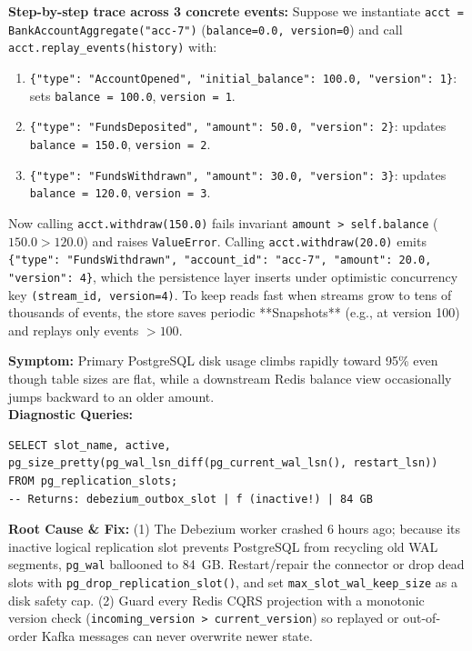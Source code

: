 \textbf{Step-by-step trace across 3 concrete events:}
Suppose we instantiate \texttt{acct = BankAccountAggregate("acc-7")} (\texttt{balance=0.0, version=0}) and call \texttt{acct.replay\_events(history)} with:
\begin{enumerate}[leftmargin=18pt]
  \item \texttt{\{"type": "AccountOpened", "initial\_balance": 100.0, "version": 1\}}: sets \texttt{balance = 100.0}, \texttt{version = 1}.
  \item \texttt{\{"type": "FundsDeposited", "amount": 50.0, "version": 2\}}: updates \texttt{balance = 150.0}, \texttt{version = 2}.
  \item \texttt{\{"type": "FundsWithdrawn", "amount": 30.0, "version": 3\}}: updates \texttt{balance = 120.0}, \texttt{version = 3}.
\end{enumerate}
Now calling \texttt{acct.withdraw(150.0)} fails invariant \texttt{amount > self.balance} ($150.0 > 120.0$) and raises \texttt{ValueError}. Calling \texttt{acct.withdraw(20.0)} emits \texttt{\{"type": "FundsWithdrawn", "account\_id": "acc-7", "amount": 20.0, "version": 4\}}, which the persistence layer inserts under optimistic concurrency key \texttt{(stream\_id, version=4)}. To keep reads fast when streams grow to tens of thousands of events, the store saves periodic **Snapshots** (e.g., at version 100) and replays only events $> 100$.

\begin{realworldbox}
\textbf{Symptom:} Primary PostgreSQL disk usage climbs rapidly toward 95\% even though table sizes are flat, while a downstream Redis balance view occasionally jumps backward to an older amount.\\
\textbf{Diagnostic Queries:}
\begin{verbatim}
SELECT slot_name, active, pg_size_pretty(pg_wal_lsn_diff(pg_current_wal_lsn(), restart_lsn))
FROM pg_replication_slots;
-- Returns: debezium_outbox_slot | f (inactive!) | 84 GB
\end{verbatim}
\textbf{Root Cause \& Fix:} (1) The Debezium worker crashed 6 hours ago; because its inactive logical replication slot prevents PostgreSQL from recycling old WAL segments, \texttt{pg\_wal} ballooned to 84~GB. Restart/repair the connector or drop dead slots with \texttt{pg\_drop\_replication\_slot()}, and set \texttt{max\_slot\_wal\_keep\_size} as a disk safety cap. (2) Guard every Redis CQRS projection with a monotonic version check (\texttt{incoming\_version > current\_version}) so replayed or out-of-order Kafka messages can never overwrite newer state.
\end{realworldbox}

